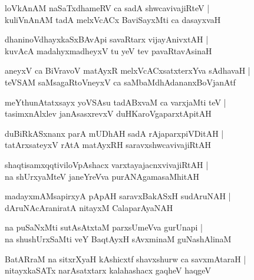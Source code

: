 \documentclass[twoside,12pt,openright]{book}
\newcounter{shloka}[chapter]
\begin{document}
\begin{shloka}%
loVkAnAM naSaTxdhameRV ca sadA shwcavivajiRteV |\\
kuliVnAnAM tadA melxVcACx BaviSayxMti ca dasayxvaH 
\end{shloka}

\begin{shloka}%
dhaninoVdhayxkaSxBAvApi savaRtarx vijayAnivxtAH |\\
kuvAcA madahyxmadheyxV tu yeV tev pavaRtavAsinaH 
\end{shloka}

\begin{shloka}%
aneyxV ca BiVravoV matAyxR melxVcACxsatxterxYva sAdhavaH |\\
teVSAM saMsagaRtoVneyxV ca saMbaMdhAdananxBoVjanAtf
\end{shloka}

\begin{shloka}%
meYthunAtatxsayx yoVSAsu tadABxvaM ca varxjaMti teV |\\
tasimxnAlxlev janAsasxrevxV duHKaroVgaparxtApitAH 
\end{shloka}

\begin{shloka}%
duBiRkASxnanx parA mUDhAH sadA rAjaparxpiVDitAH |\\
tatArxsateyxV rAtA matAyxRH saravxshwcavivajiRtAH 
\end{shloka}

\begin{shloka}%
shaqtisamxqqtiviloVpAshacx varxtayajacnxvivajiRtAH |\\
na shUrxyaMteV janeYreVva purANAgamasaMhitAH 
\end{shloka}

\begin{shloka}%
madayxmAMsapirxyA pApAH saravxBakASxH sudAruNAH |\\
dAruNAcAraniratA nitayxM CalaparAyaNAH 
\end{shloka}

\begin{shloka}%
na puSaNxMti sutAsAtxtaM parxsUmeVva gurUnapi |\\
na shushUrxSaMti veY BaqtAyxH sAvxminaM guNashAlinaM 
\end{shloka}

\begin{shloka}%
BatARraM na sitxrXyaH kAshicxtf shavxshurw ca savxmAtaraH |\\
nitayxkaSATx narAsatxtarx kalahashacx gaqheV haqgeV 
\end{shloka}
\end{document}

